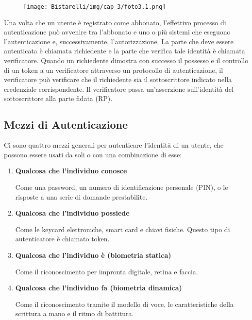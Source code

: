 \begin{figure}[H]
	\centering
    \texttt{[image: Bistarelli/img/cap\_3/foto3.1.png]}
\end{figure}

Una volta che un utente è registrato come abbonato, l'effettivo processo di autenticazione può avvenire tra l'abbonato e uno o più sistemi che eseguono l'autenticazione e, successivamente, l'autorizzazione. La parte che deve essere autenticata è chiamata richiedente e la parte che verifica tale identità è chiamata verificatore. Quando un richiedente dimostra con successo il possesso e il controllo di un token a un verificatore attraverso un protocollo di autenticazione, il verificatore può verificare che il richiedente sia il sottoscrittore indicato nella credenziale corrispondente. Il verificatore passa un'asserzione sull'identità del sottoscrittore alla parte fidata (RP).

\newpage
\subsection{Mezzi di Autenticazione}
Ci sono quattro mezzi generali per autenticare l'identità di un utente, che possono essere usati da soli o con una combinazione di esse:
\begin{enumerate}
    \item \textbf{Qualcosa che l'individuo conosce}
    
    Come una password, un numero di identificazione personale (PIN), o le risposte a una serie di domande prestabilite.
    
    \item \textbf{Qualcosa che l'individuo possiede}
    
    Come le keycard elettroniche, smart card e chiavi fisiche. Questo tipo di autenticatore è chiamato token.
    
    \item \textbf{Qualcosa che l'individuo è (biometria statica)}
    
    Come il riconoscimento per impronta digitale, retina e faccia.
    
    \item \textbf{Qualcosa che l'individuo fa (biometria dinamica)}
    
    Come il riconoscimento tramite il modello di voce, le caratteristiche della scrittura a mano e il ritmo di battitura.
\end{enumerate}

